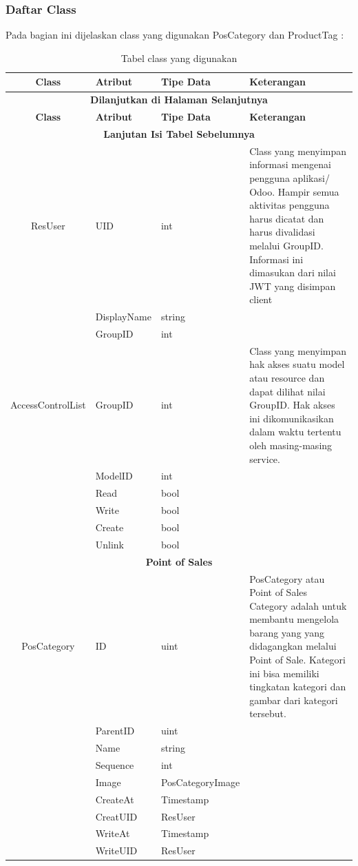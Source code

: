 \subsubsection{ Daftar Class}
Pada bagian ini dijelaskan class yang digunakan PosCategory dan ProductTag :

\begin{longtable}{|c|p{3cm}|p{3cm}|p{4cm}|}
	\caption{Tabel class yang digunakan}
	\label{tab:daftar-class}\\
	\hline
	\textbf{Class} & \textbf{Atribut} & \textbf{Tipe Data} & \textbf{Keterangan} \\
	\hline
	\endfirsthead
	\hline
	\multicolumn{4}{|c|}{\textbf{Dilanjutkan di Halaman Selanjutnya}} \\
	\hline
	\textbf{Class} & \textbf{Atribut} & \textbf{Tipe Data} & \textbf{Keterangan} \\
	\hline
	\endhead
	\hline
	\multicolumn{4}{|c|}{\textbf{Lanjutan Isi Tabel Sebelumnya}} \\
	\hline
	\endfoot
	\hline
	\endlastfoot
	ResUser & UID & int & Class yang menyimpan informasi mengenai pengguna aplikasi/ Odoo. Hampir semua aktivitas pengguna harus dicatat dan harus divalidasi melalui GroupID. Informasi ini dimasukan dari nilai JWT yang disimpan client \\
	\cline{2-3}
	& DisplayName & string & \\
	\cline{2-3}
	& GroupID & int & \\
	\hline
	AccessControlList & GroupID & int & Class yang menyimpan hak akses suatu model atau resource dan dapat dilihat nilai GroupID. Hak akses ini dikomunikasikan dalam waktu tertentu oleh masing-masing service.  \\
	\cline{2-3}
	& ModelID & int & \\
	\cline{2-3}
	& Read & bool & \\
	\cline{2-3}
	& Write & bool & \\
	\cline{2-3}
	& Create & bool & \\
	\cline{2-3}
	& Unlink & bool & \\
	\hline

	\multicolumn{4}{|c|}{\textbf{Point of Sales}} \\
	\hline
	PosCategory & ID & uint & PosCategory atau Point of Sales Category adalah untuk membantu mengelola barang yang yang didagangkan melalui Point of Sale. Kategori ini bisa memiliki tingkatan kategori dan gambar dari kategori tersebut. \\
	\cline{2-3}
	& ParentID & uint & \\
	\cline{2-3}
	& Name & string & \\
	\cline{2-3}
	& Sequence & int & \\
	\cline{2-3}
	& Image &  PosCategoryImage & \\
	\cline{2-3}
	& CreateAt & Timestamp & \\
	\cline{2-3}
	& CreatUID & ResUser & \\
	\cline{2-3}
	& WriteAt & Timestamp & \\
	\cline{2-3}
	& WriteUID & ResUser & \\


\end{longtable}
